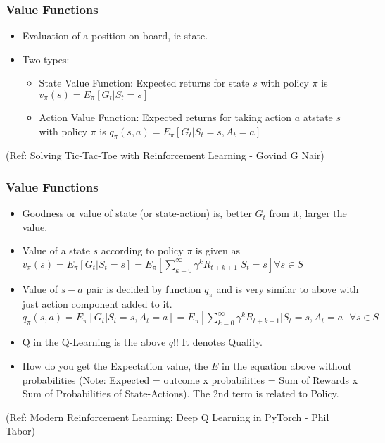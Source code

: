 \begin{frame}[fragile]\frametitle{Value Functions}


\begin{itemize}
\item Evaluation of a position on board, ie state.
\item Two types:
	\begin{itemize}
	\item State Value Function: Expected returns for state $s$ with policy $\pi$ is $v_{\pi}(s) = E_{\pi}[G_t|S_t=s]$
	\item Action Value Function: Expected returns for taking action $a$ atstate $s$ with policy $\pi$ is $q_{\pi}(s,a) = E_{\pi}[G_t|S_t=s, A_t=a]$
	\end{itemize}

\end{itemize}



{\tiny (Ref: Solving Tic-Tac-Toe with Reinforcement Learning - Govind G Nair)}

\end{frame}

\begin{frame}[fragile]\frametitle{Value Functions}

\begin{itemize}
\item Goodness or value of state (or state-action) is, better $G_t$ from it, larger the value.
\item Value of a state $s$ according to policy $\pi$ is given as $v_{\pi}(s) = E_{\pi}[G_t|S_t=s]=E_{\pi}[\sum_{k=0}^{\infty}\gamma^kR_{t+k+1}|S_t=s] \forall s \in S$
\item Value of $s-a$ pair is decided by function $q_{\pi}$ and is very similar to above with just action component added to it. $q_{\pi}(s,a) = E_{\pi}[G_t|S_t=s, A_t=a]=E_{\pi}[\sum_{k=0}^{\infty}\gamma^kR_{t+k+1}|S_t=s, A_t=a] \forall s \in S$
\item Q in the Q-Learning is the above $q$!! It denotes Quality.
\item How do you get the Expectation value, the $E$ in the equation above without probabilities (Note: Expected = outcome x probabilities = Sum of Rewards x Sum of Probabilities of State-Actions). The 2nd term is related to Policy.
\end{itemize}

{\tiny (Ref: Modern Reinforcement Learning: Deep Q Learning in PyTorch - Phil Tabor)}

\end{frame}

